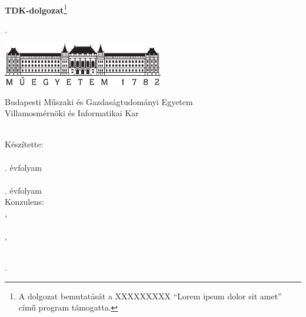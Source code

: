 \begin{titlepage}
  	$\;$ 
	\vspace{5cm}
	
	\begin{center}
	\Huge
	\textbf{TDK-dolgozat}\let\thefootnote\relax\footnote{A dolgozat bemutatását a XXXXXXXXX  ``Lorem ipsum dolor sit amet'' című program támogatta.}
	\end{center}
	
	\vspace{13cm}
	
	\Large
	\hspace{8cm} \vikszerzoVezeteknev{} \vikszerzoKeresztnev
	
	\hspace{8cm} \tdkszerzoB
	
	\hspace{8cm} \tdkev.
\end{titlepage}

\newpage
\thispagestyle{empty}


\begin{titlepage}
  \begin{center}  
  \includegraphics[width=7cm]{./figures/bme_logo.pdf}
  \vspace{0.3cm}
  
  Budapesti Műszaki és Gazdaságtudományi Egyetem \\
  Villamosmérnöki és Informatikai Kar \\
  \viktanszek \\
  \vspace{3.5cm}
  
  \huge {\vikcim}
  \vspace{1.5cm}
  
  \large {\textbf{\vikdoktipus}}
  \vfill
    
  {\Large 
  	{\large Készítette:} \\ \vspace{0.2cm}
  	\vikszerzoVezeteknev{} \vikszerzoKeresztnev \\ \tdkevfolyamA. évfolyam \\
	\vspace{0.5cm}
	\tdkszerzoB \\ \tdkevfolyamB. évfolyam \\
  	\vspace{1.5cm}
  	{\large Konzulens:} \\ \vspace{0.2cm}
  	\vikkonzulensA,\\ \tdkkonzulensbeosztasA \\
  	\vspace{0.5cm}
  	\vikkonzulensB,\\ \tdkkonzulensbeosztasB \\
  }
  
  \vspace{2cm}
  \large {\tdkev.}
  
 \end{center}
\end{titlepage}